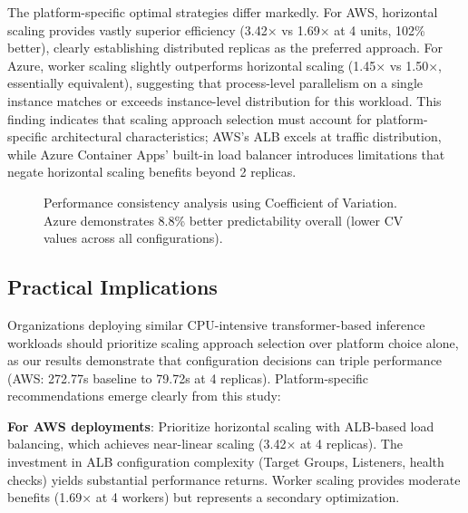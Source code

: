 The platform-specific optimal strategies differ markedly. For AWS, horizontal scaling provides vastly superior efficiency (3.42× vs 1.69× at 4 units, 102\% better), clearly establishing distributed replicas as the preferred approach. For Azure, worker scaling slightly outperforms horizontal scaling (1.45× vs 1.50×, essentially equivalent), suggesting that process-level parallelism on a single instance matches or exceeds instance-level distribution for this workload. This finding indicates that scaling approach selection must account for platform-specific architectural characteristics; AWS's ALB excels at traffic distribution, while Azure Container Apps' built-in load balancer introduces limitations that negate horizontal scaling benefits beyond 2 replicas.

\begin{figure}[!htbp]
\centering
{}
\caption{Performance consistency analysis using Coefficient of Variation. Azure demonstrates 8.8\% better predictability overall (lower CV values across all configurations).}
\label{fig:consistency}
\end{figure}


\subsection{Practical Implications}

Organizations deploying similar CPU-intensive transformer-based inference workloads should prioritize scaling approach selection over platform choice alone, as our results demonstrate that configuration decisions can triple performance (AWS: 272.77s baseline to 79.72s at 4 replicas). Platform-specific recommendations emerge clearly from this study:

\textbf{For AWS deployments}: Prioritize horizontal scaling with ALB-based load balancing, which achieves near-linear scaling (3.42× at 4 replicas). The investment in ALB configuration complexity (Target Groups, Listeners, health checks) yields substantial performance returns. Worker scaling provides moderate benefits (1.69× at 4 workers) but represents a secondary optimization.

